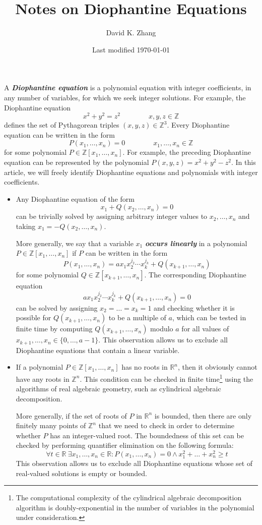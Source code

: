 \documentclass[11pt]{article}
\title{Notes on Diophantine Equations}
\author{David K. Zhang}
\date{Last modified \today}
\newcommand{\Z}{{\mathbb{Z}}}
\newcommand{\R}{{\mathbb{R}}}
\newcommand{\dfntxt}[1]{{\textbf{\textit{#1}}}}
\begin{document}
\maketitle

A \dfntxt{Diophantine equation} is a polynomial equation with integer coefficients, in any number of variables, for which we seek integer solutions. For example, the Diophantine equation
\[ x^2 + y^2 = z^2 \qquad\qquad x, y, z \in \Z \]
defines the set of Pythagorean triples $(x, y, z) \in \Z^3$. Every Diophantine equation can be written in the form
\[ P(x_1, \dots, x_n) = 0 \qquad\qquad x_1, \dots, x_n \in \Z \]
for some polynomial $P \in \Z[x_1, \dots, x_n]$. For example, the preceding Diophantine equation can be represented by the polynomial $P(x, y, z) = x^2 + y^2 - z^2$. In this article, we will freely identify Diophantine equations and polynomials with integer coefficients.

\begin{itemize}
	\item Any Diophantine equation of the form
	\[ x_1 + Q(x_2, \dots, x_n) = 0 \]
	can be trivially solved by assigning arbitrary integer values to $x_2, \dots, x_n$ and taking $x_1 = -Q(x_2, \dots, x_n)$.

	More generally, we say that a variable $x_1$ \dfntxt{occurs linearly} in a polynomial $P \in \Z[x_1, \dots, x_n]$ if $P$ can be written in the form
	\[ P(x_1, \dots, x_n) = a x_1 x_2^{j_2} \cdots x_k^{j_k} + Q(x_{k+1}, \dots, x_n) \]
	for some polynomial $Q \in \Z[x_{k+1}, \dots, x_n]$. The corresponding Diophantine equation
	\[ a x_1 x_2^{j_2} \cdots x_k^{j_k} + Q(x_{k+1}, \dots, x_n) = 0 \]
	can be solved by assigning $x_2 = \dots = x_k = 1$ and checking whether it is possible for $Q(x_{k+1}, \dots, x_n)$ to be a multiple of $a$, which can be tested in finite time by computing $Q(x_{k+1}, \dots, x_n)$ modulo $a$ for all values of $x_{k+1}, \dots, x_n \in \{0, \dots, a - 1\}$. This observation allows us to exclude all Diophantine equations that contain a linear variable.

	\item If a polynomial $P \in \Z[x_1, \dots, x_n]$ has no roots in $\R^n$, then it obviously cannot have any roots in $\Z^n$. This condition can be checked in finite time\footnote{The computational complexity of the cylindrical algebraic decomposition algorithm is doubly-exponential in the number of variables in the polynomial under consideration.} using the algorithms of real algebraic geometry, such as cylindrical algebraic decomposition.

	More generally, if the set of roots of $P$ in $\R^n$ is bounded, then there are only finitely many points of $\Z^n$ that we need to check in order to determine whether $P$ has an integer-valued root. The boundedness of this set can be checked by performing quantifier elimination on the following formula:
	\[ \forall t \in \R\ \exists x_1, \dots, x_n \in \R: P(x_1, \dots, x_n) = 0 \wedge x_1^2 + \dots + x_n^2 \ge t \]
	This observation allows us to exclude all Diophantine equations whose set of real-valued solutions is empty or bounded.
\end{itemize}
\end{document}
